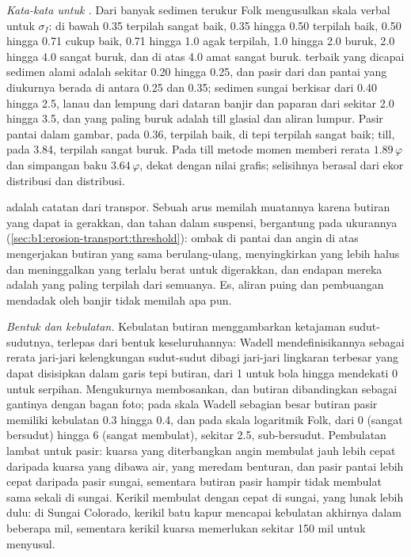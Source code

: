 \emph{Kata-kata untuk .} Dari banyak sedimen terukur Folk mengusulkan skala verbal untuk $\sigma_I$: di bawah \num{0.35} terpilah sangat baik, \num{0.35} hingga \num{0.50} terpilah baik, \num{0.50} hingga \num{0.71} cukup baik, \num{0.71} hingga \num{1.0} agak terpilah, \num{1.0} hingga \num{2.0} buruk, \num{2.0} hingga \num{4.0} sangat buruk, dan di atas \num{4.0} amat sangat buruk.  terbaik yang dicapai sedimen alami adalah sekitar \num{0.20} hingga \num{0.25}, dan pasir dari  dan pantai yang diukurnya berada di antara \num{0.25} dan \num{0.35}; sedimen sungai berkisar dari \num{0.40} hingga \num{2.5}, lanau dan lempung dari dataran banjir dan paparan dari sekitar \num{2.0} hingga \num{3.5}, dan yang paling buruk  adalah till glasial dan aliran lumpur. Pasir pantai dalam gambar, pada \num{0.36}, terpilah baik, di tepi terpilah sangat baik; till, pada \num{3.84}, terpilah sangat buruk. Pada till metode momen memberi rerata $1.89\,\varphi$ dan simpangan baku $3.64\,\varphi$, dekat dengan nilai grafis; selisihnya berasal dari ekor distribusi dan  distribusi.

 adalah catatan dari transpor. Sebuah arus memilah muatannya karena butiran yang dapat ia gerakkan, dan tahan dalam suspensi, bergantung pada ukurannya (\cref{sec:b1:erosion-transport:threshold}): ombak di pantai dan angin di atas  mengerjakan butiran yang sama berulang-ulang, menyingkirkan yang lebih halus dan meninggalkan yang terlalu berat untuk digerakkan, dan endapan mereka adalah yang paling terpilah dari semuanya. Es, aliran puing dan pembuangan mendadak oleh banjir tidak memilah apa pun.

\emph{Bentuk dan kebulatan.} Kebulatan butiran menggambarkan ketajaman sudut-sudutnya, terlepas dari bentuk keseluruhannya: Wadell mendefinisikannya sebagai rerata jari-jari kelengkungan sudut-sudut dibagi jari-jari lingkaran terbesar yang dapat disisipkan dalam garis tepi butiran, dari 1 untuk bola hingga mendekati 0 untuk serpihan. Mengukurnya membosankan, dan butiran dibandingkan sebagai gantinya dengan bagan foto; pada skala Wadell sebagian besar butiran pasir memiliki kebulatan \num{0.3} hingga \num{0.4}, dan pada skala logaritmik Folk, dari 0 (sangat bersudut) hingga 6 (sangat membulat), sekitar \num{2.5}, sub-bersudut. Pembulatan lambat untuk pasir: kuarsa yang diterbangkan angin membulat jauh lebih cepat daripada kuarsa yang dibawa air, yang meredam benturan, dan pasir pantai lebih cepat daripada pasir sungai, sementara butiran pasir hampir tidak membulat sama sekali di sungai. Kerikil membulat dengan cepat di sungai, yang lunak lebih dulu: di Sungai Colorado, kerikil batu kapur mencapai kebulatan akhirnya dalam beberapa mil, sementara kerikil kuarsa memerlukan sekitar 150 mil untuk menyusul.

